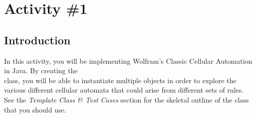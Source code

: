 
  \pagebreak

	\section{Activity \#1}
		\subsection{Introduction}
	  In this activity, you will be implementing Wolfram's Classic Cellular Automation in Java. By creating the\\  class, you will be able to instantiate multiple  objects in order to explore the various different cellular automata that could arise from different sets of rules. See the \emph{Template Class \& Test Cases} section for the skeletal outline of the  class that you should use.

